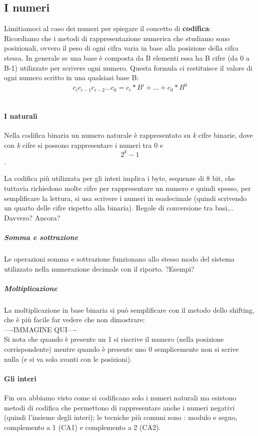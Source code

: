 \subsection{I numeri}
Limitiamoci al caso dei numeri per spiegare il concetto di \textbf{codifica}:\\
Ricordiamo che i  metodi di rappresentazione numerica che studiamo sono posizionali, ovvero il peso di ogni cifra varia in base alla posizione della cifra stessa.
In generale se una base è composta da B elementi essa ha B cifre (da 0 a B-1) utilizzate per scrivere ogni numero.
Questa formula ci restituisce il valore di ogni numero scritto in una qualsiasi base B:\\
\[c_{i} c_{i-1} c_{i-2}... c_{0}=c_{i}*B^{i}+...+c_{0}*B^{0}\]\\


\paragraph*{I naturali} Nella codifica binaria un numero naturale è rappresentato su \textit{k} cifre binarie, dove con \textit{k} cifre si possono rappresentare i numeri tra 0 e \[2^{k}-1\].


La codifica più utilizzata per gli interi implica i byte, sequenze di 8 bit, che tuttavia richiedono molte cifre per rappresentare un numero e quindi spesso, per semplificare la lettura, si usa scrivere i numeri in esadecimale (quindi scrivendo un quarto delle cifre rispetto alla binaria).
Regole di conversione tra basi…. Davvero? Ancora?
\subparagraph*{Somma e sottrazione} Le operazioni somma e sottrazione funzionano allo stesso modo del sistema utilizzato nella numerazione decimale con il riporto. ?Esempi?

\subparagraph*{Moltiplicazione} La moltiplicazione in base binaria si può semplificare con il metodo dello shifting, che è più facile far vedere che non dimostrare:  \\----IMMAGINE QUI---- \\
Si nota che quando è presente un 1 si riscrive il numero (nella posizione corrispondente) mentre  quando è presente uno 0 semplicemente non si scrive nulla (e si va solo avanti con le posizioni).

\paragraph*{Gli interi} Fin ora abbiamo visto come si codificano solo i numeri naturali ma esistono metodi di codifica che permettono di rappresentare anche i numeri negativi (quindi l’insieme degli interi); le tecniche più comuni sono : modulo e segno, complemento a 1 (CA1) e complemento a 2 (CA2).

